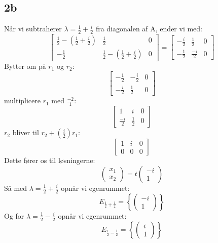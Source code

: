 \documentclass{article}
\begin{document}
\subsection*{2b}
Når vi subtraherer $\lambda=\frac{1}{2}+\frac{i}{2}$ fra diagonalen af $\mathrm{A}$, ender vi med:
$$
\left[\begin{array}{cr|r}
\frac{1}{2}-\left(\frac{1}{2}+\frac{i}{2}\right) & \frac{1}{2} & 0 \\
-\frac{1}{2} & \frac{1}{2}-\left(\frac{1}{2}+\frac{i}{2}\right) & 0
\end{array}\right]=\left[\begin{array}{rr|r}
-\frac{i}{2} & \frac{1}{2} & 0 \\
-\frac{1}{2} & \frac{-i}{2} & 0
\end{array}\right]
$$
Bytter om på $r_1$ og $r_2$:
$$
\left[\begin{array}{cc|c}
-\frac{1}{2} & -\frac{i}{2} & 0 \\
-\frac{i}{2} & \frac{1}{2} & 0
\end{array}\right]
$$
multiplicere $r_1$ med $\frac{-2}{1}$:
$$
\left[\begin{array}{cc|c}
1 & i & 0 \\
\frac{-i}{2} & \frac{1}{2} & 0
\end{array}\right]
$$
$r_2$ bliver til $r_2+\left(\frac{i}{2}\right) r_1$:
$$
\left[\begin{array}{ll|l}
1 & i & 0 \\
0 & 0 & 0
\end{array}\right]
$$
Dette fører os til løsningerne:
$$
\left(\begin{array}{l}
x_1 \\
x_2
\end{array}\right)=t\left(\begin{array}{c}
-i \\
1
\end{array}\right)
$$
Så med $\lambda=\frac{1}{2}+\frac{i}{2}$ opnår vi egenrummet:
$$
E_{\frac{1}{2}+\frac{1}{2}}=\left\{\left(\begin{array}{c}
-i \\
1
\end{array}\right)\right\}
$$
Og for $\lambda=\frac{1}{2}-\frac{i}{2}$ opnår vi egenrummet:
$$
E_{\frac{1}{2}-\frac{i}{2}}=\left\{\left(\begin{array}{c}
i \\
1
\end{array}\right)\right\}
$$
\end{document}
